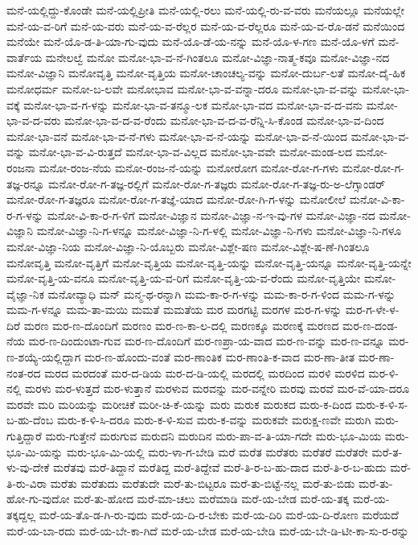 {ಮನೆ-ಯಲ್ಲಿದ್ದು-ಕೊಂಡೇ
ಮನೆ-ಯಲ್ಲಿಪ್ರೀತಿ
ಮನೆ-ಯಲ್ಲಿ-ರಲು
ಮನೆ-ಯಲ್ಲಿ-ರು-ವ-ವರು
ಮನೆಯಲ್ಲೂ
ಮನೆಯಲ್ಲೇ
ಮನೆ-ಯ-ವ-ರಿಗೆ
ಮನೆ-ಯ-ವರು
ಮನೆ-ಯ-ವ-ರೆಲ್ಲರ
ಮನೆ-ಯ-ವ-ರೆಲ್ಲರೂ
ಮನೆ-ಯ-ವ-ರೊ-ಡನೆ
ಮನೆಯಿಂದ
ಮನೆಯೇ
ಮನೆ-ಯೊ-ಡ-ತಿ-ಯಾ-ಗು-ವುದು
ಮನೆ-ಯೊ-ಡೆ-ಯ-ನನ್ನು
ಮನೆ-ಯೊ-ಳ-ಗಣ
ಮನೆ-ಯೊ-ಳಗೆ
ಮನೆ-ವಾರ್ತೆಯ
ಮನೇಲಲ್ವೆ
ಮನೋ
ಮನೋ-ಭಾ-ವ-ನೆ-ಗಿಂತಲೂ
ಮನೋ-ವಿಜ್ಞಾ-ನಾತ್ಮ-ಕವೂ
ಮನೋ-ವಿಜ್ಞಾ-ನದ
ಮನೋ-ವಿಜ್ಞಾನಿ
ಮನೋವೃತ್ತಿ
ಮನೋ-ವೃತ್ತಿಯ
ಮನೋ-ಚಾಂಚಲ್ಯ-ವನ್ನು
ಮನೋ-ದುರ್ಬ-ಲತೆ
ಮನೋ-ದೈ-ಹಿಕ
ಮನೋಧರ್ಮ
ಮನೋ-ಬ-ಲವೇ
ಮನೋಭಾವ
ಮನೋ-ಭಾ-ವ-ವನ್ನಾ-ದರೂ
ಮನೋ-ಭಾ-ವ-ವನ್ನು
ಮನೋ-ಭಾ-ವಕ್ಕೆ
ಮನೋ-ಭಾ-ವ-ಗ-ಳನ್ನು
ಮನೋ-ಭಾ-ವ-ತನ್ಮೂ-ಲಕ
ಮನೋ-ಭಾ-ವದ
ಮನೋ-ಭಾ-ವ-ದ-ವನು
ಮನೋ-ಭಾ-ವ-ದ-ವರು
ಮನೋ-ಭಾ-ವ-ದ-ವ-ರೆಂದು
ಮನೋ-ಭಾ-ವ-ದ-ವ-ರೆನ್ನಿ-ಸಿ-ಕೊಂಡ
ಮನೋ-ಭಾ-ವ-ದಿಂದ
ಮನೋ-ಭಾ-ವನೆ
ಮನೋ-ಭಾ-ವ-ನೆ-ಗಳು
ಮನೋ-ಭಾ-ವ-ನೆ-ಯನ್ನು
ಮನೋ-ಭಾ-ವ-ನೆ-ಯಿಂದ
ಮನೋ-ಭಾ-ವ-ವನ್ನು
ಮನೋ-ಭಾ-ವ-ವಿ-ರುತ್ತದೆ
ಮನೋ-ಭಾ-ವ-ವಿಲ್ಲದ
ಮನೋ-ಭಾ-ವವೇ
ಮನೋ-ಮಂಡ-ಲದ
ಮನೋ-ರಂಜನಾ
ಮನೋ-ರಂಜ-ನೆಯ
ಮನೋ-ರಂಜ-ನೆ-ಯನ್ನು
ಮನೋರೋಗ
ಮನೋ-ರೋ-ಗ-ಗಳು
ಮನೋ-ರೋ-ಗ-ತಜ್ಞ-ರನ್ನೂ
ಮನೋ-ರೋ-ಗ-ತಜ್ಞ-ರಲ್ಲಿಗೆ
ಮನೋ-ರೋ-ಗ-ತಜ್ಞರು
ಮನೋ-ರೋ-ಗ-ತಜ್ಞ-ರು-ಅ-ಲೆಗ್ಸಾಂಡರ್
ಮನೋ-ರೋ-ಗ-ತಜ್ಞರೂ
ಮನೋ-ರೋ-ಗ-ತಜ್ಞೆ-ಯಾದ
ಮನೋ-ರೋ-ಗಿ-ಗ-ಳನ್ನು
ಮನೋಲೀಲೆ
ಮನೋ-ವಿ-ಕಾ-ರ-ಗ-ಳನ್ನು
ಮನೋ-ವಿ-ಕಾ-ರ-ಗ-ಳಿಗೆ
ಮನೋ-ವಿಜ್ಞಾನ
ಮನೋ-ವಿಜ್ಞಾ-ನ-ಇ-ವು-ಗಳ
ಮನೋ-ವಿಜ್ಞಾ-ನದ
ಮನೋ-ವಿಜ್ಞಾನಿ
ಮನೋ-ವಿಜ್ಞಾ-ನಿ-ಗ-ಳನ್ನೂ
ಮನೋ-ವಿಜ್ಞಾ-ನಿ-ಗ-ಳಲ್ಲಿ
ಮನೋ-ವಿಜ್ಞಾ-ನಿ-ಗಳು
ಮನೋ-ವಿಜ್ಞಾ-ನಿ-ಗಳೂ
ಮನೋ-ವಿಜ್ಞಾ-ನಿಯ
ಮನೋ-ವಿಜ್ಞಾ-ನಿ-ಯೊಬ್ಬರು
ಮನೋ-ವಿಶ್ಲೇ-ಷಣ
ಮನೋ-ವಿಶ್ಲೇ-ಷ-ಣೆ-ಗಿಂತಲೂ
ಮನೋವೃತ್ತಿ
ಮನೋ-ವೃತ್ತಿಗೆ
ಮನೋ-ವೃತ್ತಿಯ
ಮನೋ-ವೃತ್ತಿ-ಯನ್ನು
ಮನೋ-ವೃತ್ತಿ-ಯನ್ನೂ
ಮನೋ-ವೃತ್ತಿ-ಯನ್ನೇ
ಮನೋ-ವೃತ್ತಿ-ಯ-ವನೂ
ಮನೋ-ವೃತ್ತಿ-ಯ-ವ-ರಿಗೆ
ಮನೋ-ವೃತ್ತಿ-ಯ-ವ-ರೆಂದು
ಮನೋ-ವೃತ್ತಿಯೇ
ಮನೋ-ವೈಜ್ಞಾ-ನಿಕ
ಮನೋವ್ಯಾಧಿ
ಮನ್
ಮನ್ಮ-ಥ-ರನ್ನಾಗಿ
ಮಮ-ಕಾ-ರ-ಗ-ಳನ್ನು
ಮಮ-ಕಾ-ರ-ಗ-ಳಿಂದ
ಮಮ-ಗ-ಳನ್ನು
ಮಮ-ಗ-ಳನ್ನೂ
ಮಮ-ತಾ-ಮಯಿ
ಮಮತೆ
ಮಮತೆಯ
ಮರ
ಮರಗಟ್ಟಿ
ಮರಗಳ
ಮರ-ಗ-ಳನ್ನು
ಮರ-ಗ-ಳೇ-ಳ-ದಿರೆ
ಮರಣ
ಮರ-ಣ-ದೊಂದಿಗೆ
ಮರಣಂ
ಮರ-ಣ-ಕಾ-ಲ-ದಲ್ಲಿ
ಮರಣಕ್ಕೂ
ಮರಣಕ್ಕೆ
ಮರಣದ
ಮರ-ಣ-ದಂಡ-ನೆಯ
ಮರ-ಣ-ದಿಂದುಂಟಾ-ಗುವ
ಮರ-ಣ-ದೊಂದಿಗೆ
ಮರ-ಣಪ್ರಾ-ಯ-ವಾದ
ಮರ-ಣ-ವನ್ನು
ಮರ-ಣ-ವನ್ನೂ
ಮರ-ಣ-ಶಯ್ಯೆ-ಯಲ್ಲಿದ್ದಾಗ
ಮರ-ಣ-ಹೊಂದು-ವಂತೆ
ಮರ-ಣಾಂತಿಕ
ಮರ-ಣಾಂತಿ-ಕ-ವಾದ
ಮರ-ಣಾ-ತೀತ
ಮರ-ಣಾ-ನಂತ-ರದ
ಮರದ
ಮರದಂತೆ
ಮರ-ದ-ಡಿಯ
ಮರ-ದ-ಡಿ-ಯಲ್ಲಿ
ಮರದಲ್ಲಿ
ಮರದಿಂದ
ಮರಳಿ
ಮರಳಿದ
ಮರ-ಳಿ-ನಲ್ಲಿ
ಮರಳು
ಮರ-ಳುತ್ತದೆ
ಮರ-ಳುತ್ತಾನೆ
ಮರಳುವ
ಮರವನ್ನು
ಮರ-ವನ್ನೇರಿ
ಮರವು
ಮರವೆ
ಮರ-ವೆ-ಯಾ-ದರೂ
ಮರವೇ
ಮರಿ
ಮರಿಯನ್ನು
ಮರೀಚಿಕೆ
ಮರೀ-ಚಿ-ಕೆ-ಯನ್ನು
ಮರು
ಮರುಕ
ಮರುಕದ
ಮರು-ಕ-ದಿಂದ
ಮರು-ಕ-ಳಿ-ಸ-ಬ-ಹು-ದೆಂಬ
ಮರು-ಕ-ಳಿ-ಸಿ-ದರೂ
ಮರು-ಕ-ಳಿ-ಸುವ
ಮರು-ಕ-ವನ್ನು
ಮರುಕವೇ
ಮರುಕ್ಷ-ಣವೇ
ಮರುಗಿ
ಮರು-ಗುತ್ತಿದ್ದಾರೆ
ಮರು-ಗುತ್ತೇನೆ
ಮರುಗುವ
ಮರುದನಿ
ಮರುದಿನ
ಮರು-ಪಾ-ವ-ತಿ-ಯಾ-ಗದೇ
ಮರು-ಭೂ-ಮಿಯ
ಮರು-ಭೂ-ಮಿ-ಯನ್ನು
ಮರು-ಭೂ-ಮಿ-ಯಲ್ಲಿ
ಮರು-ಳಾ-ಗ-ಬೇಡಿ
ಮರೆ
ಮರೆತ
ಮರೆತರು
ಮರೆತರೆ
ಮರೆತರೇ
ಮರೆ-ತ-ಳು-ವು-ದೇಕೆ
ಮರೆತವು
ಮರೆ-ತಿದ್ದಾನೆ
ಮರೆತಿದ್ದ
ಮರೆ-ತಿದ್ದೇವೆ
ಮರೆ-ತಿ-ರ-ಬ-ಹು-ದಾದ
ಮರೆ-ತಿ-ರ-ಬ-ಹುದು
ಮರೆ-ತಿ-ರು-ವಿರಾ
ಮರೆತು
ಮರೆತುದು
ಮರೆತುದೇ
ಮರೆ-ತು-ಬಿಟ್ಟರೂ
ಮರೆ-ತು-ಬಿಟ್ಟೆ-ನಲ್ಲ
ಮರೆ-ತು-ಬಿಡು
ಮರೆ-ತು-ಹೋ-ಗು-ವುದೋ
ಮರೆ-ತು-ಹೋದ
ಮರೆ-ಮಾ-ಚಲು
ಮರೆಮಾಡಿ
ಮರೆ-ಯ-ಬೇಡ
ಮರೆ-ಯ-ತಕ್ಕ
ಮರೆ-ಯ-ತಕ್ಕದ್ದಲ್ಲ
ಮರೆ-ಯ-ತೊ-ಡ-ಗಿ-ರು-ವುದು
ಮರೆ-ಯ-ದಿ-ರ-ಬೇಕು
ಮರೆ-ಯ-ದಿರಿ
ಮರೆ-ಯ-ದಿ-ರೋಣ
ಮರೆಯದೆ
ಮರೆ-ಯ-ಬಾ-ರದು
ಮರೆ-ಯ-ಬೇ-ಕಾ-ಗಿದೆ
ಮರೆ-ಯ-ಬೇಡ
ಮರೆ-ಯ-ಬೇಡಿ
ಮರೆ-ಯ-ಬೇ-ಡಿ-ಟೀ-ಕಾ-ಸು-ರ-ರನ್ನು
}
